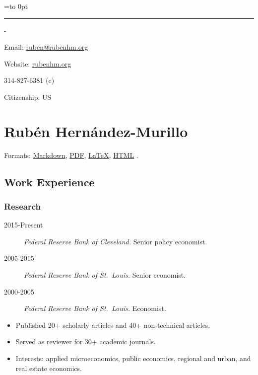 \documentclass[10pt,]{article}
\newenvironment{nospace}
  {\par\edef\theprevdepth{\the\prevdepth}\nointerlineskip
   \setbox\zerobox=\vtop to 0pt\bgroup
   \hrule height0pt\kern\dimexpr\baselineskip-\topskip\relax
  }
  {\par\vss\egroup\ht\zerobox=0pt \wd\zerobox=0pt \dp\zerobox=0pt
   \box\zerobox}
\def\tightlist{}
\begin{document}
\begin{nospace}\begin{flushright}
Email: \href{mailto:ruben@rubenhm.org}{ruben@rubenhm.org}

Website: \href{http://www.rubenhm.org}{rubenhm.org}

314-827-6381 (c)

Citizenship: US


\end{flushright}\end{nospace}

\hypertarget{rubuxe9n-hernuxe1ndez-murillo}{%
\section{Rubén Hernández-Murillo}\label{rubuxe9n-hernuxe1ndez-murillo}}

Formats:
\href{https://raw.github.com/rubenhm/rubenhm.github.io/source/assets/docs/Ruben_Hernandez-Murillo-Resume.md}{Markdown},
\href{http://www.rubenhm.org/assets/docs/Ruben_Hernandez-Murillo-Resume.pdf}{PDF},
\href{https://raw.github.com/rubenhm/rubenhm.github.io/source/assets/docs/Ruben_Hernandez-Murillo-Resume.tex}{\LaTeX},
\href{https://raw.github.com/rubenhm/rubenhm.github.io/source/assets/docs/Ruben_Hernandez-Murillo-Resume.html}{HTML}
.

\hypertarget{work-experience}{%
\subsection{Work Experience}\label{work-experience}}

\hypertarget{research}{%
\subsubsection{Research}\label{research}}

\begin{description}
\tightlist
\item[2015-Present]
\emph{Federal Reserve Bank of Cleveland.} Senior policy economist.
\item[2005-2015]
\emph{Federal Reserve Bank of St.~Louis.} Senior economist.
\item[2000-2005]
\emph{Federal Reserve Bank of St.~Louis.} Economist.
\end{description}

\begin{itemize}
\tightlist
\item
  Published 20+ scholarly articles and 40+ non-technical articles.
\item
  Served as reviewer for 30+ academic journals.
\item
  Interests: applied microeconomics, public economics, regional and
  urban, and real estate economics.
\end{itemize}
\end{document}
